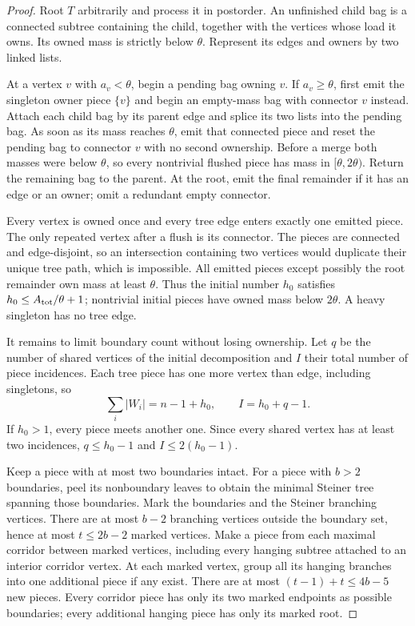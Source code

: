 \begin{proof}
Root $T$ arbitrarily and process it in postorder. An unfinished child
bag is a connected subtree containing the child, together with the
vertices whose load it owns. Its owned mass is strictly below $\theta$.
Represent its edges and owners by two linked lists.

At a vertex $v$ with $a_v<\theta$, begin a pending bag owning $v$.
If $a_v\geq\theta$, first emit the singleton owner piece $\{v\}$
and begin an empty-mass bag with connector $v$ instead. Attach each
child bag by its parent edge and splice its two lists into the pending
bag. As soon as its mass reaches $\theta$, emit that connected piece
and reset the pending bag to connector $v$ with no second ownership.
Before a merge both masses were below $\theta$, so every nontrivial
flushed piece has mass in $[\theta,2\theta)$. Return the remaining
bag to the parent. At the root, emit the final remainder if it has an
edge or an owner; omit a redundant empty connector.

Every vertex is owned once and every tree edge enters exactly one
emitted piece. The only repeated vertex after a flush is its connector.
The pieces are connected and edge-disjoint, so an intersection containing
two vertices would duplicate their unique tree path, which is impossible.
All emitted pieces except possibly the root remainder own mass at least
$\theta$. Thus the initial number $h_0$ satisfies
$h_0\leq A_{\rm tot}/\theta+1$; nontrivial initial pieces have owned
mass below $2\theta$. A heavy singleton has no tree edge.

It remains to limit boundary count without losing ownership. Let $q$
be the number of shared vertices of the initial decomposition and $I$
their total number of piece incidences. Each tree piece has one more
vertex than edge, including singletons, so
\[
 \sum_i|W_i|=n-1+h_0,\qquad I=h_0+q-1.
\]
If $h_0>1$, every piece meets another one. Since every shared vertex
has at least two incidences, $q\leq h_0-1$ and $I\leq2(h_0-1)$.

Keep a piece with at most two boundaries intact. For a piece with
$b>2$ boundaries, peel its nonboundary leaves to obtain the minimal
Steiner tree spanning those boundaries. Mark the boundaries and the
Steiner branching vertices. There are at most $b-2$ branching vertices
outside the boundary set, hence at most $t\leq2b-2$ marked vertices.
Make a piece from each maximal corridor between marked vertices,
including every hanging subtree attached to an interior corridor vertex.
At each marked vertex, group all its hanging branches into one additional
piece if any exist. There are at most $(t-1)+t\leq4b-5$ new pieces.
Every corridor piece has only its two marked endpoints as possible
boundaries; every additional hanging piece has only its marked root.


\end{proof}
